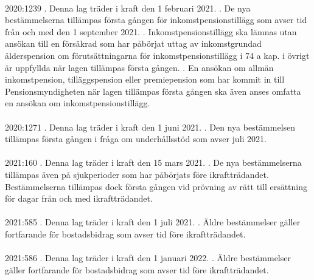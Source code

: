 \documentclass[a4paper,notitlepage,openany,10pt]{book}
\begin{document}
\paragraph*{}
2020:1239
. Denna lag träder i kraft den 1 februari 2021.
. De nya bestämmelserna tillämpas första gången för inkomstpensionstillägg som avser tid från och med den 1 september 2021.
. Inkomstpensionstillägg ska lämnas utan ansökan till en försäkrad som har påbörjat uttag av inkomstgrundad ålderspension om förutsättningarna för inkomstpensionstillägg i 74 a kap. i övrigt är uppfyllda när lagen tillämpas första gången.
. En ansökan om allmän inkomstpension, tilläggspension eller premiepension som har kommit in till Pensionsmyndigheten när lagen tillämpas första gången ska även anses omfatta en ansökan om inkomstpensionstillägg.
\paragraph*{}
2020:1271
. Denna lag träder i kraft den 1 juni 2021.
. Den nya bestämmelsen tillämpas första gången i fråga om underhållsstöd som avser juli 2021.
\paragraph*{}
2021:160
. Denna lag träder i kraft den 15 mars 2021.
. De nya bestämmelserna tillämpas även på sjukperioder som har påbörjats före ikraftträdandet. Bestämmelserna tillämpas dock första gången vid prövning av rätt till ersättning för dagar från och med ikraftträdandet.
\paragraph*{}
2021:585
. Denna lag träder i kraft den 1 juli 2021.
. Äldre bestämmelser gäller fortfarande för bostadsbidrag som avser tid före ikraftträdandet.
\paragraph*{}
2021:586
. Denna lag träder i kraft den 1 januari 2022.
. Äldre bestämmelser gäller fortfarande för bostadsbidrag som avser tid före ikraftträdandet.
\end{document}
